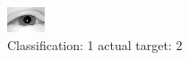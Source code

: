 \begin{figure}[h!]
\begin{center}
\includegraphics[width=0.60\columnwidth]{figures/ID2275_class_1_target_2.png}
\end{center}
\caption{ Classification: 1 actual target: 2}
\label{fig:ID2275_class_1_target_2}
\end{figure}
